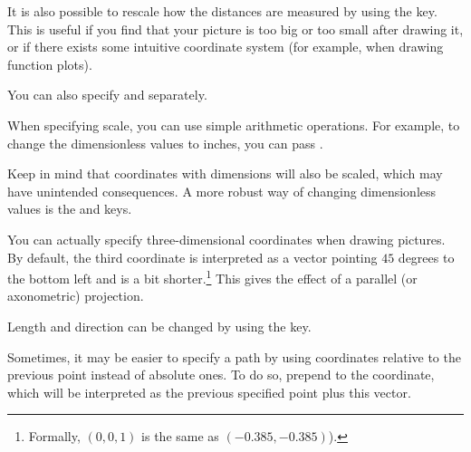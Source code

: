 It is also possible to rescale how the distances are measured by using the
 key. This is useful if you find that your picture is too big or
too small after drawing it, or if there exists some intuitive coordinate system
(for example, when drawing function plots).
\begin{example}
\end{example}
You can also specify  and  separately.

When specifying scale, you can use simple arithmetic operations. For example, to
change the dimensionless values to inches, you can pass .
\begin{example}
\end{example}
Keep in mind that coordinates with dimensions will also be scaled, which may
have unintended consequences. A more robust way of changing dimensionless
values is the  and  keys.
\begin{example}
\end{example}

You can actually specify three-dimensional coordinates when drawing pictures.
By default, the third coordinate is interpreted as a vector pointing \(45\)
degrees to the bottom left and is a bit shorter.\footnote{Formally,
\((0, 0, 1)\) is  the same as \((-0.385, -0.385)\)).}
This gives the effect of a parallel (or axonometric) projection.
\begin{example}[vertical_mode, examplewidth=0.85\linewidth]
\end{example}
Length and direction can be changed by using the  key. %

Sometimes, it may be easier to specify a path by using coordinates relative to
the previous point instead of absolute ones. To do so, prepend \ltx{++} to the
coordinate, which will be interpreted as the previous specified point plus
this vector.
\begin{example}
\end{example}

